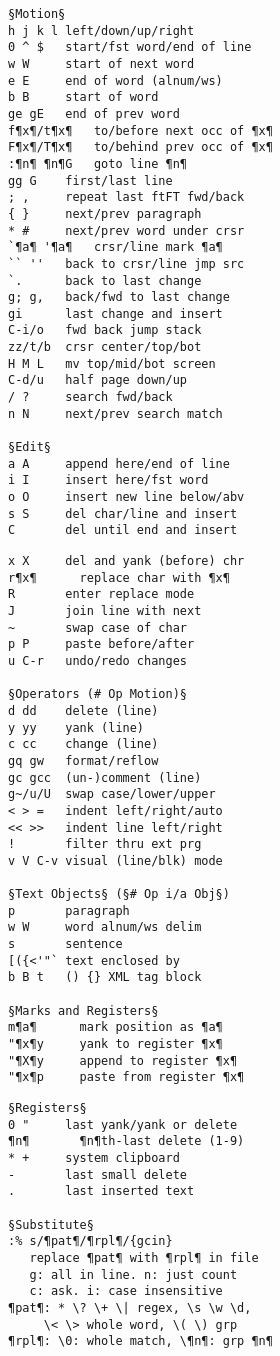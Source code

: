 \documentclass{article}
\begin{document}
\setlength{\columnsep}{7mm}
\begin{multicols}{4}
\begin{lstlisting}
§Motion§
h j k l left/down/up/right
0 ^ $   start/fst word/end of line
w W     start of next word
e E     end of word (alnum/ws)
b B     start of word
ge gE   end of prev word
f¶x¶/t¶x¶   to/before next occ of ¶x¶
F¶x¶/T¶x¶   to/behind prev occ of ¶x¶
:¶n¶ ¶n¶G   goto line ¶n¶
gg G    first/last line
; ,     repeat last ftFT fwd/back
{ }     next/prev paragraph
* #     next/prev word under crsr
`¶a¶ '¶a¶   crsr/line mark ¶a¶
`` ''   back to crsr/line jmp src
`.      back to last change
g; g,   back/fwd to last change
gi      last change and insert
C-i/o   fwd back jump stack
zz/t/b  crsr center/top/bot
H M L   mv top/mid/bot screen
C-d/u   half page down/up
/ ?     search fwd/back
n N     next/prev search match

§Edit§
a A     append here/end of line
i I     insert here/fst word
o O     insert new line below/abv
s S     del char/line and insert
C       del until end and insert
\end{lstlisting}
\begin{lstlisting}
x X     del and yank (before) chr
r¶x¶      replace char with ¶x¶
R       enter replace mode
J       join line with next
~       swap case of char
p P     paste before/after
u C-r   undo/redo changes

§Operators (# Op Motion)§
d dd    delete (line)
y yy    yank (line)
c cc    change (line)
gq gw   format/reflow
gc gcc  (un-)comment (line)
g~/u/U  swap case/lower/upper
< > =   indent left/right/auto
<< >>   indent line left/right
!       filter thru ext prg
v V C-v visual (line/blk) mode

§Text Objects§ (§# Op i/a Obj§)
p       paragraph
w W     word alnum/ws delim
s       sentence
[({<'"` text enclosed by
b B t   () {} XML tag block

§Marks and Registers§
m¶a¶      mark position as ¶a¶
"¶x¶y     yank to register ¶x¶
"¶X¶y     append to register ¶x¶
"¶x¶p     paste from register ¶x¶
\end{lstlisting}
\begin{lstlisting}
§Registers§
0 "     last yank/yank or delete
¶n¶       ¶n¶th-last delete (1-9)
* +     system clipboard
-       last small delete
.       last inserted text

§Substitute§
:% s/¶pat¶/¶rpl¶/{gcin}
   replace ¶pat¶ with ¶rpl¶ in file
   g: all in line. n: just count
   c: ask. i: case insensitive
¶pat¶: * \? \+ \| regex, \s \w \d,
     \< \> whole word, \( \) grp
¶rpl¶: \0: whole match, \¶n¶: grp ¶n¶


\end{lstlisting}
\end{multicols}
\end{document}
